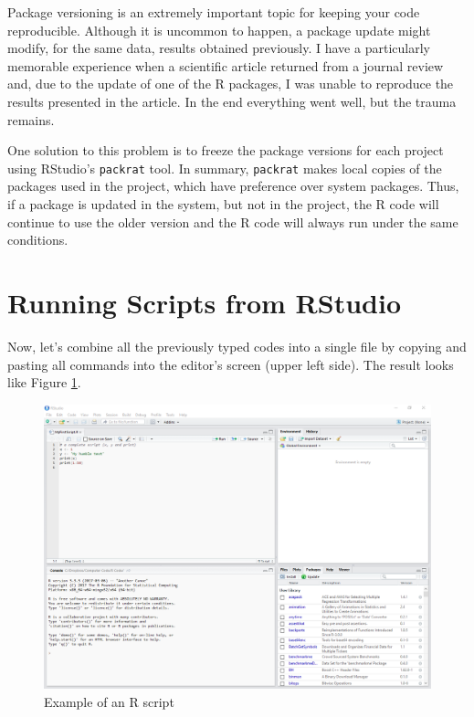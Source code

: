 \documentclass[
  12pt,
]{book}
\newenvironment{rmdimportant}
{\begin{importantblock}
		
	} {\end{importantblock}}
\begin{document}
\begin{rmdimportant}
Package versioning is an extremely important topic for keeping your code
reproducible. Although it is uncommon to happen, a package update might
modify, for the same data, results obtained previously. I have a
particularly memorable experience when a scientific article returned
from a journal review and, due to the update of one of the R packages, I
was unable to reproduce the results presented in the article. In the end
everything went well, but the trauma remains.

One solution to this problem is to freeze the package versions for each
project using RStudio's \texttt{packrat} tool. In summary,
\texttt{packrat} makes local copies of the packages used in the project,
which have preference over system packages. Thus, if a package is
updated in the system, but not in the project, the R code will continue
to use the older version and the R code will always run under the same
conditions.
\end{rmdimportant}

\hypertarget{running-scripts-from-rstudio}{%
\section{Running Scripts from RStudio}\label{running-scripts-from-rstudio}}

Now, let's combine all the previously typed codes into a single file by copying and pasting all commands into the editor's screen (upper left side). The result looks like Figure \ref{fig:example-script}.

\begin{figure}[!htbp]

{\centering \includegraphics[width=1\linewidth]{figs/RStudio_example_script} 

}

\caption{Example of an R script}\label{fig:example-script}
\end{figure}
\end{document}
